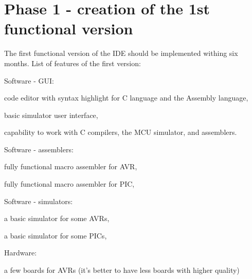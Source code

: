 \documentclass[a4paper,twoside,15pt]{book}
\begin{document}
	\section{Phase 1 - creation of the 1st functional version}
		The first functional version of the IDE should be implemented withing six months. List of features of the first version:
		\begin{dinglist}{73}
			\item Software - GUI:
				\begin{dinglist}{75}
					\item code editor with syntax highlight for C language and the Assembly language,
					\item basic simulator user interface,
					\item capability to work with C compilers, the MCU simulator, and assemblers.
				\end{dinglist}
			\item Software - assemblers:
				\begin{dinglist}{75}
					\item fully functional macro assembler for AVR,
					\item fully functional macro assembler for PIC,
				\end{dinglist}
			\item Software - simulators:
				\begin{dinglist}{75}
					\item a basic simulator for some AVRs,
					\item a basic simulator for some PICs,
				\end{dinglist}
			\item Hardware:
				\begin{dinglist}{75}
					\item a few boards for AVRs (it's better to have less boards with higher quality)
				\end{dinglist}
		\end{dinglist}
		
\end{document}
